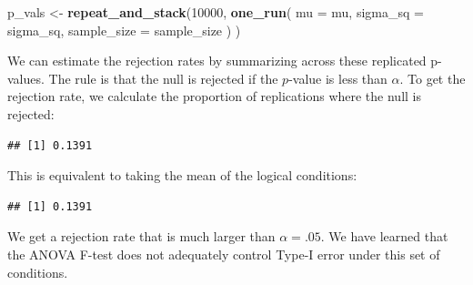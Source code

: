 \documentclass[
]{book}
\newenvironment{Shaded}{\begin{snugshade}}{\end{snugshade}}
\newcommand{\AttributeTok}[1]{\textcolor[rgb]{0.13,0.29,0.53}{#1}}
\newcommand{\DecValTok}[1]{\textcolor[rgb]{0.00,0.00,0.81}{#1}}
\newcommand{\FloatTok}[1]{\textcolor[rgb]{0.00,0.00,0.81}{#1}}
\newcommand{\FunctionTok}[1]{\textcolor[rgb]{0.13,0.29,0.53}{\textbf{#1}}}
\newcommand{\NormalTok}[1]{#1}
\newcommand{\OtherTok}[1]{\textcolor[rgb]{0.56,0.35,0.01}{#1}}
\newcommand{\SpecialCharTok}[1]{\textcolor[rgb]{0.81,0.36,0.00}{\textbf{#1}}}
\begin{document}
\begin{Shaded}
\begin{Highlighting}[]
\NormalTok{p\_vals }\OtherTok{\textless{}{-}} \FunctionTok{repeat\_and\_stack}\NormalTok{(}\DecValTok{10000}\NormalTok{, }
  \FunctionTok{one\_run}\NormalTok{(}
    \AttributeTok{mu =}\NormalTok{ mu,}
    \AttributeTok{sigma\_sq =}\NormalTok{ sigma\_sq,}
    \AttributeTok{sample\_size =}\NormalTok{ sample\_size}
\NormalTok{  ) }
\NormalTok{)}
\end{Highlighting}
\end{Shaded}

We can estimate the rejection rates by summarizing across these replicated p-values.
The rule is that the null is rejected if the \(p\)-value is less than \(\alpha\).
To get the rejection rate, we calculate the proportion of replications where the null is rejected:

\begin{Shaded}
\end{Shaded}

\begin{verbatim}
## [1] 0.1391
\end{verbatim}

This is equivalent to taking the mean of the logical conditions:

\begin{Shaded}
\end{Shaded}

\begin{verbatim}
## [1] 0.1391
\end{verbatim}

We get a rejection rate that is much larger than \(\alpha = .05\).
We have learned that the ANOVA F-test does not adequately control Type-I error under this set of conditions.

\begin{Shaded}
\end{Shaded}
\end{document}
